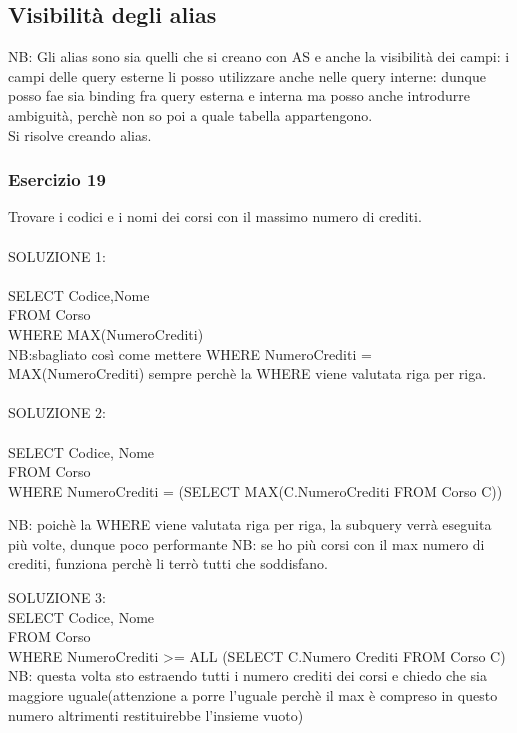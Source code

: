 \documentclass[12pt,a4paper]{book}
\begin{document}
\subsection{Visibilità degli alias}
NB: Gli alias sono sia quelli che si creano con AS e anche la visibilità dei campi: i campi delle query esterne li posso utilizzare anche nelle query interne: dunque posso fae sia binding fra query esterna e interna ma posso anche introdurre ambiguità, perchè non so poi a quale tabella appartengono.\\
Si risolve creando alias.

\subsubsection{Esercizio 19}
Trovare i codici e i nomi dei corsi con il massimo numero di crediti.\\
\\
SOLUZIONE 1:\\
\\
SELECT Codice,Nome\\
FROM Corso\\
WHERE MAX(NumeroCrediti)\\
NB:sbagliato così come mettere WHERE NumeroCrediti = MAX(NumeroCrediti) sempre perchè la WHERE viene valutata riga per riga.\\
\\
SOLUZIONE 2:\\
\\
SELECT Codice, Nome\\
FROM Corso\\
WHERE NumeroCrediti = (SELECT MAX(C.NumeroCrediti FROM Corso C))

NB: poichè la WHERE viene valutata riga per riga, la subquery verrà eseguita più volte, dunque poco performante
NB: se ho più corsi con il max numero di crediti, funziona perchè li terrò tutti che soddisfano.

SOLUZIONE 3:\\
SELECT Codice, Nome\\
FROM Corso\\
WHERE NumeroCrediti >= ALL (SELECT C.Numero Crediti FROM Corso C)
NB: questa volta sto estraendo tutti i numero crediti dei corsi e chiedo che sia maggiore uguale(attenzione a porre l'uguale perchè il max è compreso in questo numero altrimenti restituirebbe l'insieme vuoto)
\end{document}
